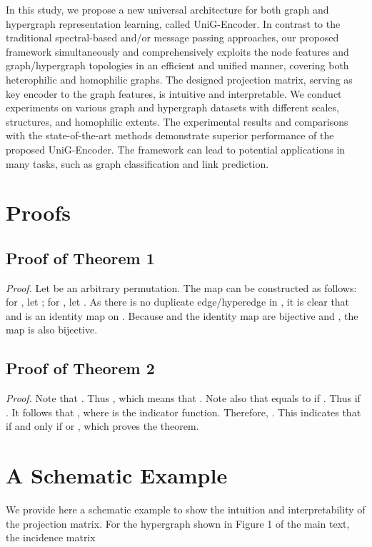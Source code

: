 \documentclass[review]{elsarticle}
\begin{document}
In this study, we propose a new universal architecture for both graph and hypergraph representation learning, called UniG-Encoder. In contrast to the traditional spectral-based and/or message passing approaches, our proposed framework simultaneously and comprehensively exploits the node features and graph/hypergraph topologies in an efficient and unified manner, covering both heterophilic and homophilic graphs. The designed projection matrix, serving as key encoder to the graph features, is intuitive and interpretable. We conduct experiments on various graph and hypergraph datasets with different scales, structures, and homophilic extents. The experimental results and comparisons with the state-of-the-art methods demonstrate superior performance of the proposed UniG-Encoder. The framework can lead to potential applications in many tasks, such as graph classification and link prediction.

\appendix
\section{Proofs}

\subsection{Proof of Theorem 1}

\textit{Proof.} Let  be an arbitrary permutation. The map  can be constructed as follows: for , let ; for , let . As there is no duplicate edge/hyperedge in , it is clear that  and  is an identity map on . Because  and the identity map are bijective and , the map  is also bijective.

\subsection{Proof of Theorem 2}

\textit{Proof.} Note that . Thus , which means that . Note also that  equals to  if . Thus  if . It follows that , where  is the indicator function. Therefore, . This indicates that  if and only if  or , which proves the theorem.

\section{A Schematic Example}

We provide here a schematic example to show the intuition and interpretability of the projection matrix. For the hypergraph shown in Figure 1 of the main text, the incidence matrix
\end{document}
